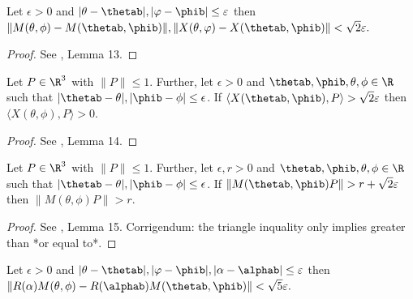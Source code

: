 \begin{lemma} \label{lem:sqrt2}
\leanok
Let $\epsilon>0$ and $|\theta-\thetab|,|\varphi-\phib| \leq \varepsilon$ then
$\|M(\theta, \phi)-M(\thetab,\phib)\|, \|X({\theta, \varphi})-X(\thetab,\phib)\| < \sqrt{2}\varepsilon.$
\end{lemma}

\begin{proof}
\leanok
See \cite{polyhedron.without.rupert}, Lemma 13.
\end{proof}

\begin{lemma} \label{lem:XPgt0}
  \leanok
    Let $P \in \R^3$ with $\|P\| \leq 1$. Further, let $\epsilon>0$ and $\thetab,\phib, \theta, \phi \in \R$ such that $|\thetab-\theta|, |\phib - \phi| \leq \epsilon$. If
    \(
        \langle X(\thetab,\phib),P \rangle>\sqrt{2}\varepsilon
    \)
    then
    \(
        \langle X(\theta, \phi),P \rangle>0.
    \)
\end{lemma}

\begin{proof}
\leanok
See \cite{polyhedron.without.rupert}, Lemma 14.
\end{proof}

\begin{lemma} \label{lem:MPgtr}
\leanok
    Let $P \in \R^3$ with $\|P\| \leq 1$. Further, let $\epsilon, r>0$ and $\thetab,\phib, \theta, \phi \in \R$ such that $|\thetab-\theta|, |\phib - \phi| \leq \epsilon$. If
    \(
        \| M(\thetab,\phib) P \| > r + \sqrt{2}\varepsilon
    \)
    then
    \(
        \| M(\theta,\phi) P \| > r.
    \)
\end{lemma}

\begin{proof}
\leanok
See \cite{polyhedron.without.rupert}, Lemma 15.
Corrigendum: the triangle inquality only implies greater than *or equal to*.
\end{proof}

\begin{lemma} \label{lem:sqrt5}
  \leanok
    Let $\epsilon>0$ and $|\theta-\thetab|,|\varphi-\phib|,|\alpha-\alphab|\leq\varepsilon$ then
    $\|R(\alpha) M(\theta, \phi)-R(\alphab)M(\thetab,\phib)\| < \sqrt{5} \varepsilon.$
\end{lemma}

